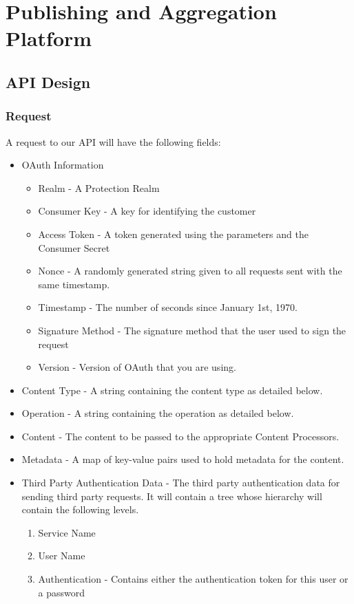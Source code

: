 \documentclass{report}
\begin{document}
\chapter{Publishing and Aggregation Platform}
	
	\section{API Design}
		\subsection{Request}
			A request to our API will have the following fields:
			\begin{itemize}
				\item OAuth Information
					\begin{itemize}
						\item Realm - A Protection Realm
						\item Consumer Key - A key for identifying the customer
						
						\item Access Token - A token generated using the parameters and the 
						Consumer Secret
						\item Nonce - A randomly generated string given to all requests sent 
						with the same timestamp.
						
						\item Timestamp - The number of seconds since January 1st, 1970.
						\item Signature Method - The signature method that the user used to 
						sign the request
						\item Version - Version of OAuth that you are using.
					\end{itemize}
				\item Content Type - A string containing the content type as detailed 
				below.
				\item Operation - A string containing the operation as detailed below.
				\item Content - The content to be passed to the appropriate Content 
				Processors.
				\item Metadata - A map of key-value pairs used to hold metadata  for the 
				content.
				\item Third Party Authentication Data - The third party authentication 
				data for sending third party requests. It will contain a tree whose 
				hierarchy will contain the following levels.
					\begin{enumerate}
						\item Service Name
						\item User Name
						\item Authentication - Contains either the authentication token for 
						this user or a password
					\end{enumerate}
			\end{itemize}
\end{document}
